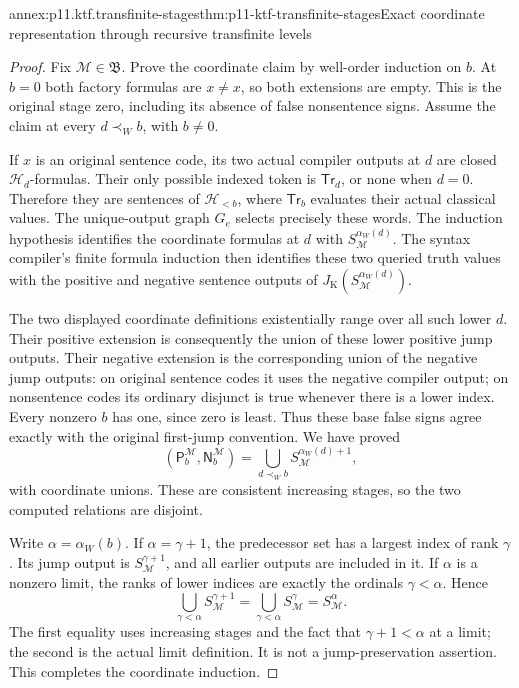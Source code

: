\begin{annexitem}{annex:p11.ktf.transfinite-stages}{thm:p11-ktf-transfinite-stages}{Exact coordinate representation through recursive transfinite levels}
\begin{proof}
Fix \(\mathcal M\in\mathfrak B\). Prove the coordinate
claim by well-order induction on \(b\). At \(b=0\)
both factory formulas are \(x\ne x\), so both extensions
are empty. This is the original stage zero, including its absence
of false nonsentence signs. Assume the claim at every
\(d\prec_W b\), with \(b\ne0\).

If \(x\) is an original sentence code, its two actual compiler
outputs at \(d\) are closed \(\mathcal H_d\)-formulas.
Their only possible indexed token is \(\mathsf{Tr}_d\),
or none when \(d=0\). Therefore they are sentences of
\(\mathcal H_{<b}\), where \(\mathsf{Tr}_b\) evaluates
their actual classical values. The unique-output graph \(G_e\)
selects precisely these words. The induction hypothesis identifies
the coordinate formulas at \(d\) with
\(S_{\mathcal M}^{\alpha_W(d)}\). The syntax compiler's
finite formula induction then identifies these two queried truth
values with the positive and negative sentence outputs of
\(J_{\mathrm K}(S_{\mathcal M}^{\alpha_W(d)})\).

The two displayed coordinate definitions existentially range over
all such lower \(d\). Their positive extension is consequently
the union of these lower positive jump outputs. Their negative
extension is the corresponding union of the negative jump outputs:
on original sentence codes it uses the negative compiler output;
on nonsentence codes its ordinary disjunct is true whenever there
is a lower index. Every nonzero \(b\) has one, since zero
is least. Thus these base false signs agree exactly with the
original first-jump convention. We have proved
\[
 (\mathsf P_b^{\mathcal M},\mathsf N_b^{\mathcal M})
    =\bigcup_{d\prec_W b}
          S_{\mathcal M}^{\alpha_W(d)+1},
\]
with coordinate unions. These are consistent increasing stages,
so the two computed relations are disjoint.

Write \(\alpha=\alpha_W(b)\). If \(\alpha=\gamma+1\),
the predecessor set has a largest index of rank \(\gamma\).
Its jump output is \(S_{\mathcal M}^{\gamma+1}\), and
all earlier outputs are included in it. If \(\alpha\) is
a nonzero limit, the ranks of lower indices are exactly the
ordinals \(\gamma<\alpha\). Hence
\[
 \bigcup_{\gamma<\alpha}S_{\mathcal M}^{\gamma+1}
   =\bigcup_{\gamma<\alpha}S_{\mathcal M}^{\gamma}
   =S_{\mathcal M}^{\alpha}.
\]
The first equality uses increasing stages and the fact that
\(\gamma+1<\alpha\) at a limit; the second is the actual
limit definition. It is not a jump-preservation assertion. This
completes the coordinate induction.


\end{proof}
\end{annexitem}

